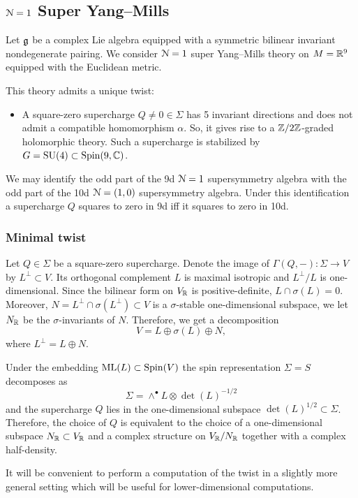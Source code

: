 \documentclass[10pt, oneside]{article}
\newcommand{\ML}{\mathrm{ML}}
\begin{document}
\subsection{\texorpdfstring{$\mathcal N=1$}{N=1} Super Yang--Mills}

Let $\mathfrak g$ be a complex Lie algebra equipped with a symmetric bilinear invariant nondegenerate pairing. We consider $\mathcal N=1$ super Yang--Mills theory on $M=\mathbb R^9$ equipped with the Euclidean metric.

This theory admits a unique twist:
\begin{itemize}
\item A square-zero supercharge $Q\neq 0\in\Sigma$ has 5 invariant directions and does not admit a compatible homomorphism $\alpha$. So, it gives rise to a $\mathbb Z/2\mathbb Z$-graded holomorphic theory. Such a supercharge is stabilized by $G=\mathrm{SU}(4)\subset \mathrm{Spin}(9, \mathbb C)$.
\end{itemize}

We may identify the odd part of the 9d $\mathcal{N}=1$ supersymmetry algebra with the odd part of the 10d $\mathcal{N}=(1, 0)$ supersymmetry algebra. Under this identification a supercharge $Q$ squares to zero in 9d iff it squares to zero in 10d.

\subsubsection{Minimal twist}
\label{sect:9dminimaltwist}

Let $Q\in\Sigma$ be a square-zero supercharge. Denote the image of $\Gamma(Q, -)\colon \Sigma\rightarrow V$ by $L^\perp\subset V$. Its orthogonal complement $L$ is maximal isotropic and $L^{\perp}/L$ is one-dimensional. Since the bilinear form on $V_\mathbb R$ is positive-definite, $L\cap \sigma(L) = 0$. Moreover, $N = L^{\perp}\cap \sigma(L^{\perp})\subset V$ is a $\sigma$-stable one-dimensional subspace, we let $N_\mathbb R$ be the $\sigma$-invariants of $N$. Therefore, we get a decomposition
\[V = L\oplus \sigma(L)\oplus N,\]
where $L^{\perp} = L\oplus N$.

Under the embedding $\ML(L)\subset \Spin(V)$ the spin representation $\Sigma=S$ decomposes as
\[\Sigma = \wedge^\bullet L\otimes \det(L)^{-1/2}\]
and the supercharge $Q$ lies in the one-dimensional subspace $\det(L)^{1/2}\subset \Sigma$. Therefore, the choice of $Q$ is equivalent to the choice of a one-dimensional subspace $N_\mathbb R\subset V_\mathbb R$ and a complex structure on $V_\mathbb R/N_\mathbb R$ together with a complex half-density.

It will be convenient to perform a computation of the twist in a slightly more general setting which will be useful for lower-dimensional computations.
\end{document}

